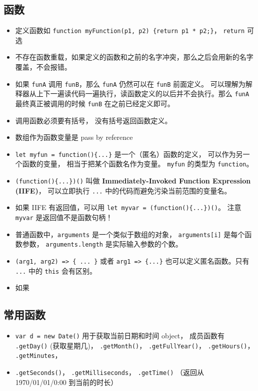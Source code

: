 \subsection{函数}
\begin{itemize}
\item 定义函数如 \verb|function myFunction(p1, p2) {return p1 * p2;}|， \verb|return| 可选
\item 不存在函数重载，如果定义的函数和之前的名字冲突，那么之后会用新的名字覆盖，不会报错。
\item 如果 \verb`funA` 调用 \verb`funB`，那么 \verb`funA` 仍然可以在 \verb`funB` 前面定义。 可以理解为解释器从上下一遍读代码一遍执行，读函数定义的以后并不会执行。那么 \verb`funA` 最终真正被调用的时候 \verb`funB` 在之前已经定义即可。
\item 调用函数必须要有括号， 没有括号返回函数定义。
\item 数组作为函数变量是 pass by reference
\item \verb|let myfun = function(){...}| 是一个（匿名）函数的定义， 可以作为另一个函数的变量， 相当于把某个函数名作为变量。 \verb`myfun` 的类型为 \verb|function|。
\item \verb|(function(){...})()| 叫做 \textbf{Immediately-Invoked Function Expression (IIFE)}， 可以立即执行 \verb|...| 中的代码而避免污染当前范围的变量名。
\item 如果 IIFE 有返回值，可以用 \verb`let myvar = (function(){...})()`。 注意 \verb`myvar` 是返回值不是函数句柄！
\item 普通函数中，\verb`arguments` 是一个类似于数组的对象， \verb`arguments[i]` 是每个函数参数， \verb`arguments.length` 是实际输入参数的个数。
\item \verb`(arg1, arg2) => { ... }` 或者 \verb`arg1 => {...}` 也可以定义匿名函数。只有 \verb`...` 中的 \verb`this` 会有区别。
\item 如果
\end{itemize}

\subsection{常用函数}
\begin{itemize}
\item \verb|var d = new Date()| 用于获取当前日期和时间 object， 成员函数有 \verb|.getDay()| (获取星期几)， \verb|.getMonth()|， \verb|.getFullYear()|， \verb|.getHours()|， \verb|.getMinutes|，
\item \verb|.getSeconds()|， \verb|.getMilliseconds|， \verb|.getTime()| （返回从 1970/01/01/0:00 到当前的时长）
\end{itemize}

